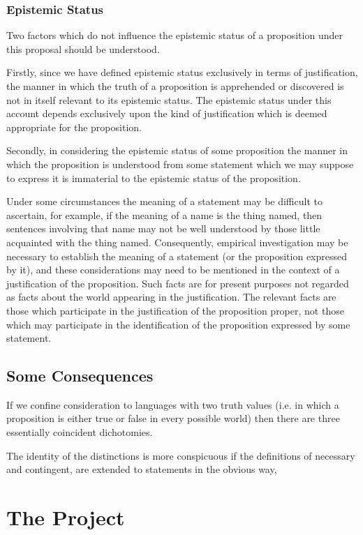 \subsection{Epistemic Status}

Two factors which do not influence the epistemic status of a proposition under this proposal should be understood.

Firstly, since we have defined epistemic status exclusively in terms of justification, the manner in which the truth of a proposition is apprehended or discovered is not in itself relevant to its epistemic status.
The epistemic status under this account depends exclusively upon the kind of justification which is deemed appropriate for the proposition.

Secondly, in considering the epistemic status of some proposition the manner in which the proposition is understood from some statement which we may suppose to express it is immaterial to the epistemic status of the proposition.

Under some circumstances the meaning of a statement may be difficult to ascertain, for example, if the meaning of a name is the thing named, then sentences involving that name may not be well understood by those little acquainted with the thing named.
Consequently, empirical investigation may be necessary to establish the meaning of a statement (or the proposition expressed by it), and these considerations may need to be mentioned in the context of a justification of the proposition.
Such facts are for present purposes not regarded as facts about the world appearing in the justification.
The relevant facts are those which participate in the justification of the proposition proper, not those which may participate in the identification of the proposition expressed by some statement.

\section{Some Consequences}

If we confine consideration to languages with two truth values (i.e.
in which a proposition is either true or false in every possible world)
then there are three essentially coincident dichotomies.

The identity of the distinctions is more conspicuous if the definitions
of necessary and contingent, are extended to statements in the obvious
way,


\chapter{The Project}\label{TheProject}

